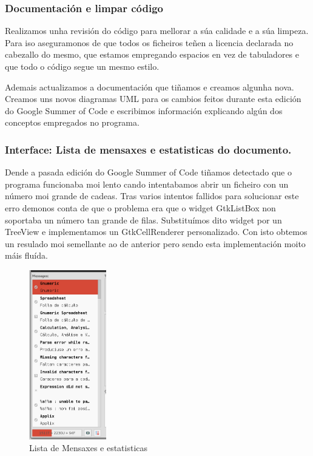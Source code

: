 \subsubsection{Documentación e limpar código}
Realizamos unha revisión do código para mellorar a súa calidade e a súa limpeza. Para iso aseguramonos de que todos os ficheiros teñen a licencia declarada no cabezallo do mesmo, que estamos empregando espacios en vez de tabuladores e que todo o código segue un mesmo estilo.

Ademais actualizamos a documentación que tiñamos e creamos algunha nova. Creamos uns novos diagramas UML para os cambios feitos durante esta edición do Google Summer of Code e escribimos información explicando algún dos conceptos empregados no programa.

\subsubsection{Interface: Lista de mensaxes e estatisticas do documento.}
Dende a pasada edición do Google Summer of Code tiñamos detectado que o programa funcionaba moi lento cando intentabamos abrir un ficheiro con un número moi grande de cadeas. Tras varios intentos fallidos para solucionar este erro demonos conta de que o problema era que o widget GtkListBox non soportaba un número tan grande de filas. Substituímos dito widget por un TreeView e implementamos un GtkCellRenderer personalizado. Con isto obtemos un resulado moi semellante ao de anterior pero sendo esta implementación moito máis fluída.

\begin{figure}[h!]
    \centering
    \includegraphics[width=0.3\textwidth]{img/gsoc2_it5_ui.png}
    \caption{Lista de Mensaxes e estatisticas}
    \label{fig:gsoc2_it5_ui}
\end{figure}

